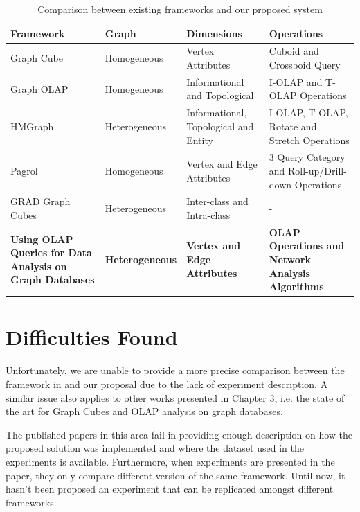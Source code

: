\begin{table}[!ht]
\setlength\extrarowheight{2pt}
\caption{Comparison between existing frameworks and our proposed system}
\label{tb:table2}
\begin{tabularx}{\textwidth}{|Y|Z|Z|Z|}
\hline
{}\textbf{Framework} & \textbf{Graph} & \textbf{Dimensions} & \textbf{Operations}\\\hline
{ Graph Cube} & Homogeneous & Vertex Attributes & Cuboid and Crossboid Query\\\hline
{ Graph OLAP} & Homogeneous & Informational and Topological & I-OLAP and T-OLAP Operations\\\hline
{ HMGraph} & Heterogeneous & Informational, Topological and Entity & I-OLAP, T-OLAP, Rotate and Stretch Operations\\\hline
{ Pagrol} & Homogeneous & Vertex and Edge Attributes & 3 Query Category and Roll-up/Drill-down Operations \\ \hline
{ GRAD Graph Cubes} & Heterogeneous & Inter-class and Intra-class & - \\ \hline
{ \textbf{Using OLAP Queries for Data Analysis on Graph Databases}} & \textbf{Heterogeneous} & \textbf{Vertex and Edge Attributes} & \textbf{OLAP Operations and Network Analysis Algorithms} \\ \hline
\end{tabularx}
\end{table}

\section{Difficulties Found}

Unfortunately, we are unable to provide a more precise comparison between the framework in \cite{Ghrab2013} and our proposal due to the lack of experiment description. A similar issue also applies to other works presented in Chapter 3, i.e. the state of the art for Graph Cubes and OLAP analysis on graph databases.

The published papers in this area fail in providing enough description on how the proposed solution was implemented and where the dataset used in the experiments is available. Furthermore, when experiments are presented in the paper, they only compare different version of the same framework. Until now, it hasn't been proposed an experiment that can be replicated amongst different frameworks.

